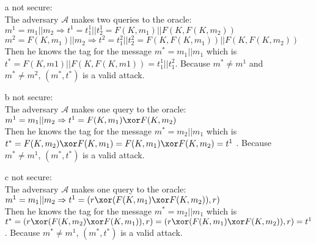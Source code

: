 \begin{itemize}
	\item[a] not secure:\\
	The adversary $\mathcal{A}$ makes two queries to the oracle:\\
	\(m^1 = m_1 \vert \vert m_2 \Rightarrow t^1 = t^1_1 \vert \vert t^1_2 = F(K, m_1) \vert \vert F(K, F(K, m_2))\)\\
	\(m^2 = F(K, m_1) \vert \vert m_2 \Rightarrow t^2 = t^2_1 \vert \vert t^2_2= F(K, F(K, m_1)) \vert \vert F(K, F(K, m_2))\)\\
	Then he knows the tag for the message \(m^* = m_1 \vert \vert m_1\) which is \(t^* = F(K, m1) \vert \vert F(K, F(K, m1)) = t^1_1 \vert \vert t^2_1\). Because \(m^* \neq m^1\) and \(m^* \neq m^2\), \((m^*, t^*)\) is a valid attack.
	
	\item[b] not secure:\\
	The adversary $\mathcal{A}$ makes one query to the oracle:\\
	\(m^1 = m_1 \vert \vert m_2 \Rightarrow t^1 = F(K, m_1) \xor F(K, m_2) \)\\
	Then he knows the tag for the message \(m^* = m_2 \vert \vert m_1\) which is \(t^* = F(K, m_2) \xor F(K, m_1) = F(K, m_1) \xor F(K, m_2) = t^1\) . Because \(m^* \neq m^1\), \((m^*, t^*)\) is a valid attack.
	
	\item[c] not secure:\\
	The adversary $\mathcal{A}$ makes one query to the oracle:\\
	\(m^1 = m_1 \vert \vert m_2 \Rightarrow t^1 = (r \xor (F(K, m_1) \xor F(K, m_2)), r) \)\\
	Then he knows the tag for the message \(m^* = m_2 \vert \vert m_1\) which is \(t^* = (r \xor (F(K, m_2) \xor F(K, m_1)), r) = (r \xor (F(K, m_1) \xor F(K, m_2)), r) = t^1\) . Because \(m^* \neq m^1\), \((m^*, t^*)\) is a valid attack.
	
\end{itemize}  
  
